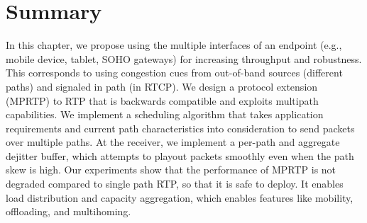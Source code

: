 


\section{Summary}

In this chapter, we propose using the multiple interfaces of an endpoint (e.g.,
mobile device, tablet, SOHO gateways) for increasing throughput and
robustness. This corresponds to using congestion cues from out-of-band  sources
(different paths) and signaled in path (in RTCP). We design a protocol
extension (MPRTP) to RTP that is backwards compatible and exploits multipath
capabilities. We implement a scheduling algorithm that takes application
requirements and current path characteristics into consideration to send
packets over multiple paths. At the receiver, we implement a per-path and
aggregate dejitter buffer, which attempts to playout packets smoothly even
when the path skew is high. Our experiments show that the performance of MPRTP
is not degraded compared to single path RTP, so that it is safe to deploy. It
enables load distribution and capacity aggregation, which enables features
like mobility, offloading, and multihoming.

